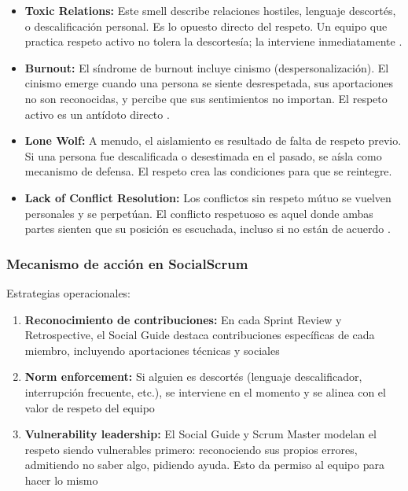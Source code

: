 \begin{itemize}

\item \textbf{Toxic Relations:} Este smell describe relaciones hostiles, lenguaje descortés, o descalificación personal. Es lo opuesto directo del respeto. Un equipo que practica respeto activo no tolera la descortesía; la interviene inmediatamente \cite{caballero2022communitysmells}.

\item \textbf{Burnout:} El síndrome de burnout incluye cinismo (despersonalización). El cinismo emerge cuando una persona se siente desrespetada, sus aportaciones no son reconocidas, y percibe que sus sentimientos no importan. El respeto activo es un antídoto directo \cite{tulili2022burnout}.

\item \textbf{Lone Wolf:} A menudo, el aislamiento es resultado de falta de respeto previo. Si una persona fue descalificada o desestimada en el pasado, se aísla como mecanismo de defensa. El respeto crea las condiciones para que se reintegre.

\item \textbf{Lack of Conflict Resolution:} Los conflictos sin respeto mútuo se vuelven personales y se perpetúan. El conflicto respetuoso es aquel donde ambas partes sienten que su posición es escuchada, incluso si no están de acuerdo \cite{saeeda2024nontechnicaldebt}.

\end{itemize}

\subsubsection*{Mecanismo de acción en SocialScrum}

Estrategias operacionales:
\begin{enumerate}
\item \textbf{Reconocimiento de contribuciones:} En cada Sprint Review y Retrospective, el Social Guide destaca contribuciones específicas de cada miembro, incluyendo aportaciones técnicas y sociales
\item \textbf{Norm enforcement:} Si alguien es descortés (lenguaje descalificador, interrupción frecuente, etc.), se interviene en el momento y se alinea con el valor de respeto del equipo
\item \textbf{Vulnerability leadership:} El Social Guide y Scrum Master modelan el respeto siendo vulnerables primero: reconociendo sus propios errores, admitiendo no saber algo, pidiendo ayuda. Esto da permiso al equipo para hacer lo mismo
\end{enumerate}

